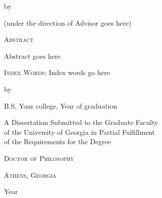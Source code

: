 \documentclass[dissertation.tex]{subfiles}
\newcommand{\mynamesc}{\textsc{\myname}}
\begin{document}

\begingroup
\thispagestyle{empty}
\centering

\vspace*{0.75in}
\Large \mytitle

\vspace{1cm}
\large by

\vspace{1cm}
\mynamesc

\vspace{1cm}
\normalsize
(under the direction of {Advisor goes here})

\vspace{2cm}
\large
\textsc{Abstract}

\endgroup

\noindent
{Abstract goes here}


\vspace{\fill}
\noindent
\textsc{Index Words:}
{Index words go here}

\pagebreak


\begingroup
\thispagestyle{empty}
\centering

\vspace*{1cm}
\Large \mytitle

\vspace{1cm}
\large by

\vspace{1cm}
\mynamesc

\vspace{1cm}
B.S. {Your college}, {Year of graduation}

\vspace{3cm}
\normalsize
A Dissertation Submitted to the Graduate Faculty\\of the University of Georgia in Partial Fulfillment\\of the Requirements for the Degree

\vspace{1cm}
\textsc{Doctor of Philosophy}

\vspace{\fill}
\textsc{Athens, Georgia}

{Year}

\endgroup
\pagebreak

\begingroup
\thispagestyle{empty}
\vspace*{\fill}
\centering
\end{document}
